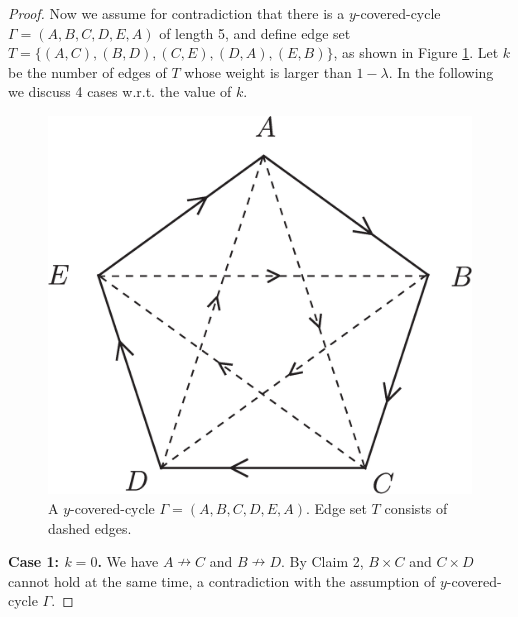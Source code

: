 \documentclass[11pt]{article}
\theoremstyle{remark}
\newcommand{\bluecomment}[1]{\textcolor{blue}{\textrm{#1}}}
\begin{document}
\begin{proof}
\medskip Now we assume for contradiction that there is a $y$-covered-cycle $\Gamma=(A,B,C,D,E,A)$ of length 5, and define edge set $T=\{(A,C),(B,D),(C,E),(D,A),(E,B)\}$, as shown in Figure \ref{fig:3}. Let $k$ be the number of edges of $T$ whose weight is larger than $1-\lambda$. In the following we discuss 4 cases w.r.t. the value of $k$.

\begin{figure}[htpb]
\begin{center}
\includegraphics[scale=0.18]{n5.eps}
\caption{\label{fig:3} A $y$-covered-cycle $\Gamma=(A,B,C,D,E,A)$. Edge set $T$ consists of dashed edges. }
\end{center}
\end{figure}


\noindent\textbf{Case 1: $k=0$.} We have $A\nrightarrow C$ and $B\nrightarrow D$. By Claim 2, $B\times C$ and $C\times D$ cannot hold at the same time, a contradiction with the assumption of  $y$-covered-cycle $\Gamma$.


\end{proof}
\end{document}
